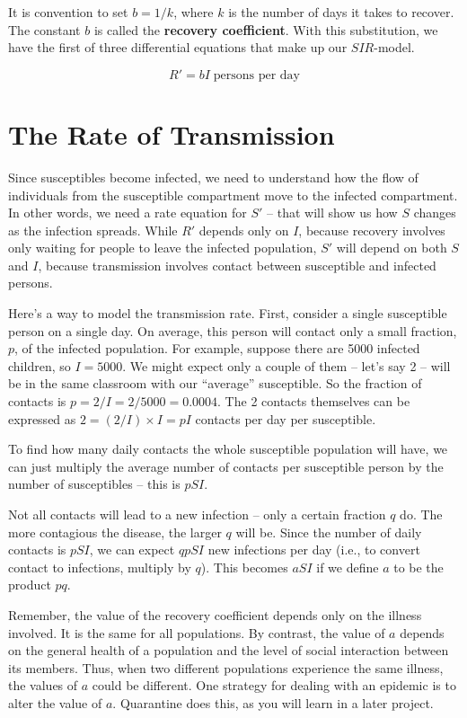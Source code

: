 \documentclass
[justified,nohyper]
{tufte-handout}
\begin{document}
It is convention to set $b=1/k$, where $k$ is the number of days it takes to 
recover. The constant $b$ is called the \textbf{recovery coefficient}. With this 
substitution, we have the first of three differential equations that make up
our $SIR$-model.

\[
    R' = bI\;\text{persons per day}
\]

\section{The Rate of Transmission}
Since susceptibles become infected, we need to understand how the flow of 
individuals from the susceptible compartment move to the infected compartment. In 
other words, we need a rate equation for $S'$ -- that will show us how $S$ 
changes as the infection spreads. While $R'$ depends only on $I$, because 
recovery involves only waiting for people to leave the infected population, $S'$ 
will depend on both $S$ and $I$, because transmission involves contact between 
susceptible and infected persons.

Here's a way to model the transmission rate. First, consider a single susceptible 
person on a single day. On average, this person will contact only a small 
fraction, $p$, of the infected population. For example, suppose there are 5000 
infected children, so $I=5000$. We might expect only a couple of them -- let's 
say 2 -- will be in the same classroom with our ``average'' susceptible. So the 
fraction of contacts is $p=2/I = 2/5000= 0.0004$. The 2 contacts themselves can 
be expressed as $2=(2/I) \times I = pI$ contacts per day per susceptible.

To find how many daily contacts the whole susceptible population will have, we can 
just multiply the average number of contacts per susceptible person by the number 
of susceptibles -- this is $pSI$.

Not all contacts will lead to a new infection -- only a certain fraction $q$ do. 
The more contagious the disease, the larger $q$ will be. Since the number of daily 
contacts is $pSI$, we can expect $qpSI$ new infections per day (i.e., to convert 
contact to infections, multiply by $q$). This becomes $aSI$ if we define $a$ to 
be the product $pq$.

Remember, the value of the recovery coefficient depends only on the illness involved. 
It is the same for all populations. By contrast, the value of $a$ depends on the 
general health of a population and the level of social interaction between its 
members. Thus, when two different populations experience the same illness, the 
values of $a$ could be different. One strategy for dealing with an epidemic is to 
alter the value of $a$. Quarantine does this, as you will learn in a later project.
\end{document}
